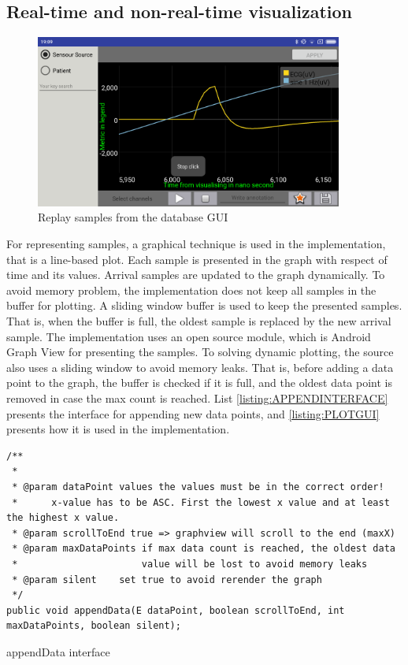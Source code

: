 \subsection{Real-time and non-real-time visualization}
\begin{figure}
    \centering
    \includegraphics[width=0.9\textwidth]{Figures/NONPLOT.png}
    \caption{Replay samples from the database GUI}
    \label{fig:Figures/NONPLOT}
\end{figure}
For representing samples, a graphical technique is used in the implementation, that is a line-based plot. Each sample is presented in the graph with respect of time and its values. Arrival samples are updated to the graph dynamically. To avoid memory problem, the implementation does not keep all samples in the buffer for plotting. A sliding window buffer is used to keep the presented samples. That is, when the buffer is full, the oldest sample is replaced by the new arrival sample. The implementation uses an open source module, which is Android Graph View\cite{GRAPHVIEWMAIN} for presenting the samples. To solving dynamic plotting, the source also uses a sliding window to avoid memory leaks. That is, before adding a data point to the graph, the buffer is checked if it is full, and the oldest data point is removed in case the max count is reached. List \ref{listing:APPENDINTERFACE}\cite{GRAPHVIEW} presents the interface for appending new data points, and \ref{listing:PLOTGUI} presents how it is used in the implementation.\\
\begin{code}[ht]
\begin{lstlisting}
/**
 *
 * @param dataPoint values the values must be in the correct order!
 *      x-value has to be ASC. First the lowest x value and at least the highest x value.
 * @param scrollToEnd true => graphview will scroll to the end (maxX)
 * @param maxDataPoints if max data count is reached, the oldest data
 *                      value will be lost to avoid memory leaks
 * @param silent    set true to avoid rerender the graph
 */
public void appendData(E dataPoint, boolean scrollToEnd, int maxDataPoints, boolean silent);
\end{lstlisting}
\caption[appendData interface\cite{GRAPHVIEW}]{appendData interface\cite{GRAPHVIEW}}
\label{listing:APPENDINTERFACE}
\end{code}
